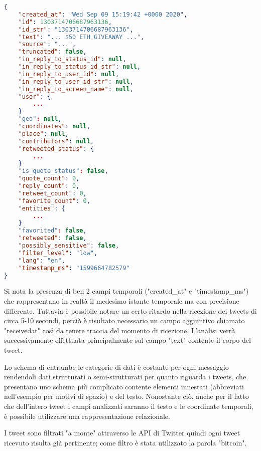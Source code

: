 \begin{lstlisting}[language=json,firstnumber=1]
{
    "created_at": "Wed Sep 09 15:19:42 +0000 2020",
    "id": 1303714706687963136,
    "id_str": "1303714706687963136",
    "text": "... $50 ETH GIVEAWAY ...",
    "source": "...",
    "truncated": false,
    "in_reply_to_status_id": null,
    "in_reply_to_status_id_str": null,
    "in_reply_to_user_id": null,
    "in_reply_to_user_id_str": null,
    "in_reply_to_screen_name": null,
    "user": {
        ...
    }
    "geo": null,
    "coordinates": null,
    "place": null,
    "contributors": null,
    "retweeted_status": {
        ...
    }
    "is_quote_status": false,
    "quote_count": 0,
    "reply_count": 0,
    "retweet_count": 0,
    "favorite_count": 0,
    "entities": {
        ...
    }
    "favorited": false,
    "retweeted": false,
    "possibly_sensitive": false,
    "filter_level": "low",
    "lang": "en",
    "timestamp_ms": "1599664782579"
}
\end{lstlisting}
%
Si nota la presenza di ben 2 campi temporali ("created\_at" e "timestamp\_ms") che
rappresentano in realtà il medesimo istante temporale ma con precisione differente.
Tuttavia è possibile notare un certo ritardo nella ricezione dei tweets di circa 5-10
secondi, perciò è risultato necessario un campo aggiuntivo chiamato "receivedat" così
da tenere traccia del momento di ricezione.
L'analisi verrà successivamente effettuata principalmente sul campo "text" contente il
corpo del tweet.

Lo schema di entrambe le categorie di dati è costante per ogni messaggio rendendoli dati
strutturati o semi-strutturati per quanto riguarda i tweets, che presentano uno schema più complicato
contente elementi innestati (abbreviati nell'esempio per motivi di spazio) e del testo.
Nonostante ciò, anche per il fatto che dell'intero tweet i campi analizzati saranno il testo
e le coordinate temporali, è possibile utilizzare una rappresentazione relazionale.

I tweet sono filtrati "a monte" attraverso le API di Twitter quindi ogni tweet ricevuto risulta già
pertinente; come filtro è stata utilizzato la parola "bitcoin".


